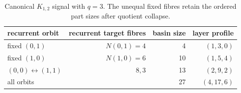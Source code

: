 \begin{table}[t]
\centering
\caption{Canonical \(K_{1,2}\) signal with \(q=3\).  The unequal fixed
fibres retain the ordered part sizes after quotient collapse.}
\label{tab:k12}
\begin{tabular}{lrrr}
\toprule
recurrent orbit & recurrent target fibres & basin size & layer profile\\
\midrule
fixed \((0,1)\) & \(N(0,1)=4\) & 4 & \((1,3,0)\)\\
fixed \((1,0)\) & \(N(1,0)=6\) & 10 & \((1,5,4)\)\\
\((0,0)\leftrightarrow(1,1)\) & \(8,3\) & 13 & \((2,9,2)\)\\
\midrule
all orbits & & 27 & \((4,17,6)\)\\
\bottomrule
\end{tabular}
\end{table}


